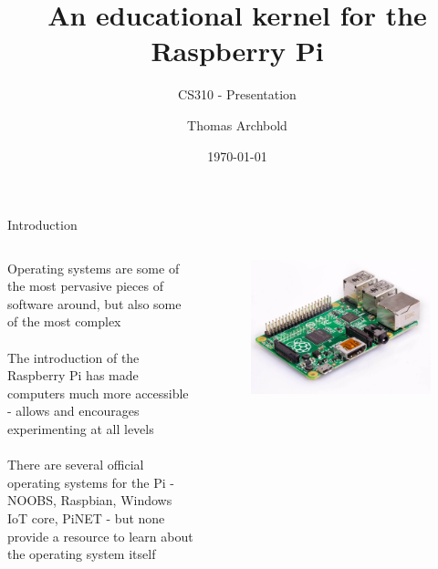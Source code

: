 \documentclass[10pt]{beamer}
\title{An educational kernel for the Raspberry Pi}
\subtitle{CS310 - Presentation}
\author{Thomas Archbold}
\date{\today}
\begin{document}
\begin{frame}
    \titlepage
\end{frame}

\begin{frame}{Introduction}

\begin{columns}[c]
    Operating systems are some of the most pervasive pieces of software around, but also some of the most complex \\~\\

    The introduction of the Raspberry Pi has made computers much more accessible - allows and encourages experimenting at all levels \\~\\

    There are several official operating systems for the Pi - NOOBS, Raspbian, Windows IoT core, PiNET - but none provide a resource to learn about the operating system itself

    \begin{figure}
        \includegraphics[width=\linewidth]{raspi1B.jpg}
    \end{figure}
\end{columns}

\end{frame}
\end{document}
